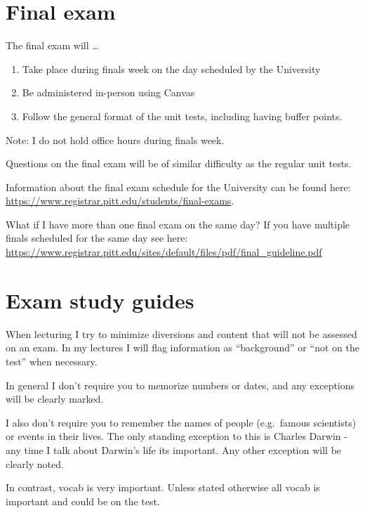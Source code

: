\documentclass[
]{book}
\providecommand{\tightlist}{%
  \setlength{\itemsep}{0pt}\setlength{\parskip}{0pt}}
\begin{document}
\hypertarget{final-exam}{%
\chapter{Final exam}\label{final-exam}}

The final exam will \ldots{}

\begin{enumerate}
\def\labelenumi{\arabic{enumi}.}
\tightlist
\item
  Take place during finals week on the day scheduled by the University
\item
  Be administered in-person using Canvas
\item
  Follow the general format of the unit tests, including having buffer points.
\end{enumerate}

Note: I do not hold office hours during finals week.

Questions on the final exam will be of similar difficulty as the regular unit tests.

Information about the final exam schedule for the University can be found here:
\url{https://www.registrar.pitt.edu/students/final-exams}.

What if I have more than one final exam on the same day?
If you have multiple finals scheduled for the same day see here:
\url{https://www.registrar.pitt.edu/sites/default/files/pdf/final_guideline.pdf}

\hypertarget{exam-study-guides}{%
\chapter{Exam study guides}\label{exam-study-guides}}

When lecturing I try to minimize diversions and content that will not be assessed on an exam. In my lectures I will flag information as ``background'' or ``not on the test'' when necessary.

In general I don't require you to memorize numbers or dates, and any exceptions will be clearly marked.

I also don't require you to remember the names of people (e.g.~famous scientists) or events in their lives. The only standing exception to this is Charles Darwin - any time I talk about Darwin's life its important. Any other exception will be clearly noted.

In contrast, vocab is very important. Unless stated otherwise all vocab is important and could be on the test.
\end{document}
